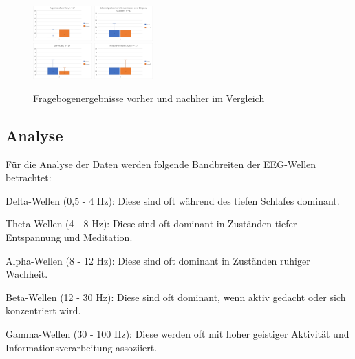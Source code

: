 \documentclass[conference]{IEEEtran}
\begin{document}
\begin{figure}[ht]
	\centering
	\includegraphics[width=0.2\textwidth]{assets/augenBesch.png} \hspace{-5pt}
	\includegraphics[width=0.2\textwidth]{assets/fokus.png} \\
	\vspace{2pt}
	\includegraphics[width=0.2\textwidth]{assets/schwitz.png} \hspace{-5pt}
	\includegraphics[width=0.2\textwidth]{assets/verschwSicht.png}
	\caption{Fragebogenergebnisse vorher und nachher im Vergleich}
	\label{fig:Fragebogenergebnisse}
\end{figure}

\subsection{Analyse}
Für die Analyse der Daten werden folgende Bandbreiten der EEG-Wellen betrachtet:
\begin{myitemize}
    \item Delta-Wellen (0,5 - 4 Hz): Diese sind oft während des tiefen Schlafes dominant.
    \item Theta-Wellen (4 - 8 Hz): Diese sind oft dominant in Zuständen tiefer Entspannung und Meditation.
    \item Alpha-Wellen (8 - 12 Hz): Diese sind oft dominant in Zuständen ruhiger Wachheit.
    \item Beta-Wellen (12 - 30 Hz): Diese sind oft dominant, wenn aktiv gedacht oder sich konzentriert wird.
    \item Gamma-Wellen (30 - 100 Hz): Diese werden oft mit hoher geistiger Aktivität und Informationsverarbeitung assoziiert.
\end{myitemize}
\end{document}

